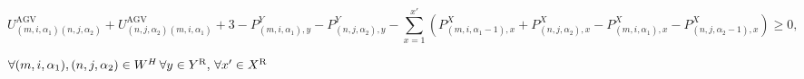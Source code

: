 \documentclass{article}
\begin{document}
\begin{landscape}









\[
U^{\text{AGV}}_{(m,i,\alpha_1)(n,j,\alpha_2)} + U^{\text{AGV}}_{(n,j,\alpha_2)(m,i,\alpha_1)} + 3
- P^Y_{(m,i,\alpha_1),y} -P^Y_{(n,j,\alpha_2),y} -
\sum_{x=1}^{x'}\left(P^X_{(m,i,\alpha_1 -1),x} + P^X_{(n,j,\alpha_2),x} - P^X_{(m,i,\alpha_1),x} - P^X_{(n,j,\alpha_2 -1),x} \right)\ge 0,
\]
\begin{RTL}
	\hspace{1cm}		
$	\raggedright
\forall (m,i,\alpha_1), (n,j,\alpha_2)\in W^H \, \forall y \in Y^{\text{R}}, \,\forall x'\in X^{\text{R}}$

\end{RTL}






\end{landscape}
\end{document}
